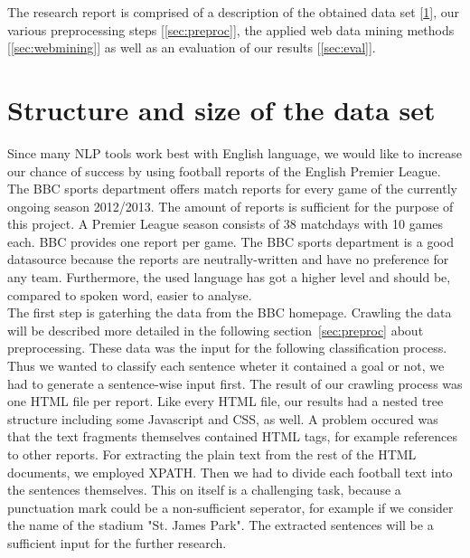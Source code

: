 \documentclass[11pt,titlepage,oneside,openany]{book}
\begin{document}
The research report is comprised of a description of the obtained data set [\ref{sec:structure}], our various preprocessing steps [\ref{sec:preproc}], the applied web data mining methods [\ref{sec:webmining}] as well as an evaluation of our results [\ref{sec:eval}].

\section{Structure and size of the data set}
\label{sec:structure}

Since many NLP tools work best with English language, we would like to increase our chance of success by using football reports of the English Premier League. The BBC sports department offers match reports for every game of the currently ongoing season 2012/2013. The amount of reports is sufficient for the purpose of this project. A Premier League season consists of 38 matchdays with 10 games each. BBC provides one report per game. The BBC sports department is a good datasource because the reports are neutrally-written and have no preference for any team. Furthermore, the used language has got a higher level and should be, compared to spoken word, easier to analyse. \\

The first step is gaterhing the data from the BBC homepage. Crawling the data will be described more detailed in the following section~\ref{sec:preproc} about preprocessing. These data was the input for the following classification process. Thus we wanted to classify each sentence wheter it contained a goal or not, we had to generate a sentence-wise input first.  The result of our crawling process was one HTML file per report. Like every HTML file, our results had a nested tree structure including some Javascript and CSS, as well. A problem occured was that the text fragments themselves contained HTML tags, for example references to other reports. For extracting the plain text from the rest of the HTML documents, we employed XPATH. Then we had to divide each football text into the sentences themselves. This on itself is a challenging task, because a punctuation mark could be a non-sufficient seperator, for example if we consider the name of the stadium "St. James Park". The extracted sentences will be a sufficient input for the further research.
\end{document}
